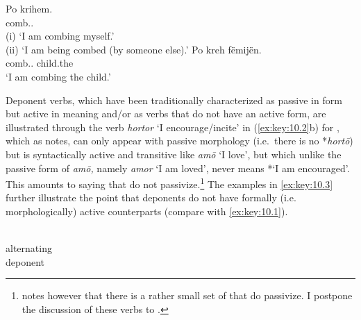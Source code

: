 \documentclass[output=paper]{langsci/langscibook}
\begin{document}
\ea%
\label{ex:key:10.1} 
    \ea
	\gll    Po    krihem.\\
            \Prog{}  comb.\Fsg.\Nact{}\\
    \glt    (i) ‘I am combing myself.’\\
            (ii) ‘I am being combed (by someone else).’
    \ex
	\gll    Po    kreh        fëmijën.\\
            \Prog{}  comb.\Fsg.\Act{}  child.the\\
    \glt    ‘I am combing the child.’
    \z
\z

Deponent verbs, which have been traditionally characterized as passive in form
but active in meaning and/or as verbs that do not have an active form, are
illustrated through the verb \emph{hortor} ‘I encourage/incite’ in
(\ref{ex:key:10.2}b) for , which as \citet{Grestenberger2018a} notes, can
only appear with passive morphology (i.e.\ there is no *\emph{hortō}) but is
syntactically active and transitive like \emph{amō} ‘I love’, but which unlike
the passive form of \emph{amō,} namely \emph{amor} ‘I am loved’, never means
*‘I am encouraged’. This amounts to saying that  do not
passivize.\footnote{\textcite{Grestenberger2014,Grestenberger2018a} notes
however that there is a rather small set of  that do
passivize. I postpone the discussion of these verbs to .}
The  examples in \eqref{ex:key:10.3} further illustrate the point
that deponents do not have formally (i.e. morphologically) active counterparts
(compare with \eqref{ex:key:10.1}).

\ea\label{ex:key:10.2} \\%
         
    \ea alternating  \\
         
    \ex deponent \tab{---} \\
        \tab{} 
    \z
\z
\end{document}
